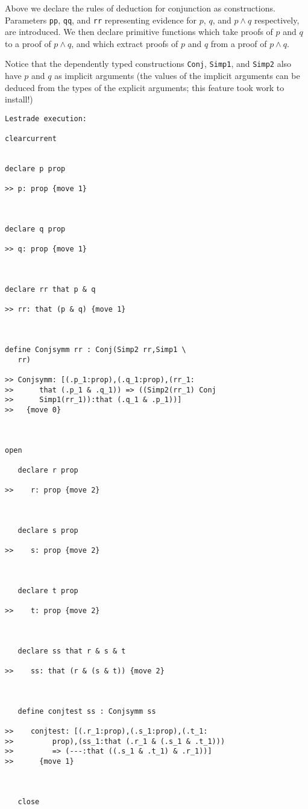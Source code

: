 \documentclass[12pt]{article}
\begin{document}
Above we declare the rules of deduction for conjunction as constructions.   Parameters {\tt pp}, {\tt qq}, and {\tt rr} representing evidence for $p$, $q$, and $p \wedge q$ respectively, are introduced.  We then declare primitive functions which take proofs of $p$ and $q$ to a proof of $p \wedge q$, and which extract proofs of $p$ and $q$ from a proof of $p \wedge q$.

Notice that the dependently typed constructions {\tt Conj}, {\tt Simp1}, and {\tt Simp2} also have $p$ and $q$ as implicit arguments (the values of the implicit arguments can be deduced from the types of the explicit arguments;  this feature took work to install!)

\begin{verbatim}Lestrade execution:

clearcurrent


declare p prop

>> p: prop {move 1}



declare q prop

>> q: prop {move 1}



declare rr that p & q

>> rr: that (p & q) {move 1}



define Conjsymm rr : Conj(Simp2 rr,Simp1 \
   rr)

>> Conjsymm: [(.p_1:prop),(.q_1:prop),(rr_1:
>>      that (.p_1 & .q_1)) => ((Simp2(rr_1) Conj
>>      Simp1(rr_1)):that (.q_1 & .p_1))]
>>   {move 0}



open

   declare r prop

>>    r: prop {move 2}



   declare s prop

>>    s: prop {move 2}



   declare t prop

>>    t: prop {move 2}



   declare ss that r & s & t

>>    ss: that (r & (s & t)) {move 2}



   define conjtest ss : Conjsymm ss

>>    conjtest: [(.r_1:prop),(.s_1:prop),(.t_1:
>>         prop),(ss_1:that (.r_1 & (.s_1 & .t_1)))
>>         => (---:that ((.s_1 & .t_1) & .r_1))]
>>      {move 1}



   close
\end{verbatim}
\end{document}
